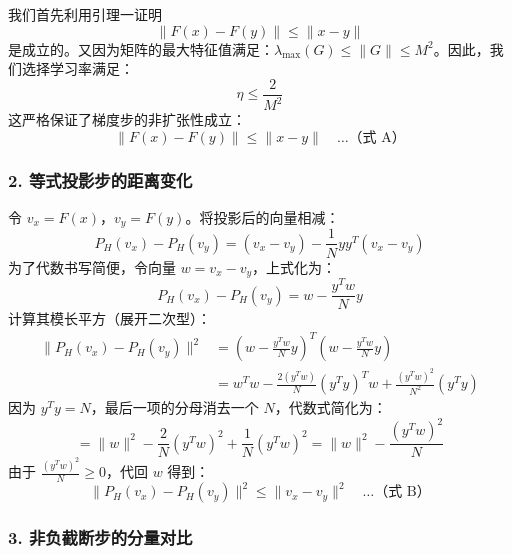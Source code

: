 我们首先利用引理一证明
\begin{equation}
\|F(x) - F(y)\| \leqslant \|x - y\|
\end{equation}
是成立的。又因为矩阵的最大特征值满足：$\lambda_{\max}(G) \leqslant \|G\| \leqslant M^2$。因此，我们选择学习率满足：
\begin{equation}
\boxed{ \eta \leqslant \frac{2}{M^2} }
\end{equation}
这严格保证了梯度步的非扩张性成立：
\begin{equation}
\boxed{ \|F(x) - F(y)\|\leqslant \|x - y\| } \quad \dots \text{（式 A）}
\end{equation}

\subsubsection{2. 等式投影步的距离变化}

令 $v_x = F(x)$，$v_y = F(y)$。将投影后的向量相减：
\begin{equation}
P_H(v_x) - P_H(v_y) = (v_x - v_y) - \frac{1}{N} y y^T (v_x - v_y)
\end{equation}
为了代数书写简便，令向量 $w = v_x - v_y$，上式化为：
\begin{equation}
P_H(v_x) - P_H(v_y) = w - \frac{y^T w}{N} y
\end{equation}
计算其模长平方（展开二次型）：
\begin{equation}
\begin{aligned}
\|P_H(v_x) - P_H(v_y)\|^2 &= \left( w - \frac{y^T w}{N} y \right)^T \left( w - \frac{y^T w}{N} y \right) \\
&= w^T w - \frac{2(y^T w)}{N} (y^T y)^T w + \frac{(y^T w)^2}{N^2} (y^T y)
\end{aligned}
\end{equation}
因为 $y^T y = N$，最后一项的分母消去一个 $N$，代数式简化为：
\begin{equation}
= \|w\|^2 - \frac{2}{N} (y^T w)^2 + \frac{1}{N} (y^T w)^2 = \|w\|^2 - \frac{(y^T w)^2}{N}
\end{equation}
由于 $\frac{(y^T w)^2}{N} \geqslant 0$，代回 $w$ 得到：
\begin{equation}
\boxed{ \|P_H(v_x) - P_H(v_y)\|^2 \leqslant \|v_x - v_y\|^2 } \quad \dots \text{（式 B）}
\end{equation}

\subsubsection{3. 非负截断步的分量对比}

